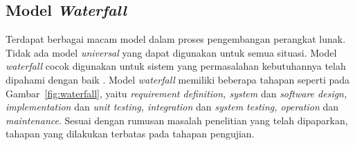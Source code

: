 \subsection{Model \emph{Waterfall}}

Terdapat berbagai macam model dalam proses pengembangan perangkat
lunak. Tidak ada model \emph{universal} yang dapat digunakan untuk
semua situasi. Model \emph{waterfall} cocok digunakan untuk sistem
yang permasalahan kebutuhannya telah dipahami dengan baik
\parencite{pressman2010software}. Model \emph{waterfall} memiliki
beberapa tahapan seperti pada Gambar~\ref{fig:waterfall}, yaitu
\emph{requirement definition, system} dan \emph{software design,
  implementation} dan \emph{unit testing, integration} dan
\emph{system testing, operation} dan \emph{maintenance}. Sesuai dengan
rumusan masalah penelitian yang telah dipaparkan, tahapan yang
dilakukan terbatas pada tahapan pengujian.

